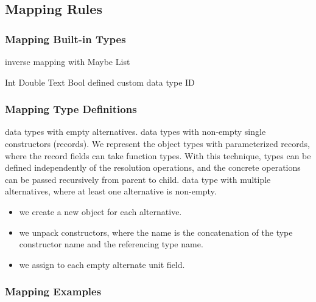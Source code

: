 
\subsection{Mapping Rules}

\begin{frame}\frametitle{Mapping Built-in Types}
\begin{itemize}
  \begin{itemize}
     inverse mapping with Maybe
     List
  \end{itemize}
  \begin{itemize}
     Int
     Double
     Text
     Bool
      defined custom data type ID 
  \end{itemize}
\end{itemize}
\end{frame}

\begin{frame}\frametitle{Mapping Type Definitions}

\begin{itemize}
   data types with empty alternatives.
   data types with non-empty single constructors (records). 
   We represent the object types with parameterized records, where the record fields can take function types. With this technique, types can be defined independently of the resolution operations, and the concrete operations can be passed recursively from parent to child. 
   data type with multiple alternatives, where at least one alternative is non-empty.
  \begin{itemize}
    \item we create a new object for each alternative.
    \item we unpack constructors, where the name is the concatenation of the type constructor name and the referencing type name. 
    \item we assign to each empty alternate unit field.
  \end{itemize}
\end{itemize}

\end{frame}

\begin{frame}[allowframebreaks]\frametitle{Mapping Examples}
  




\end{frame}
